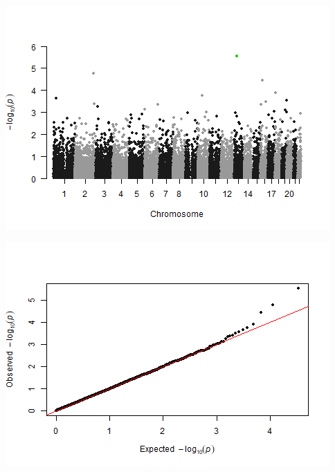 \documentclass[
]{article}
\newenvironment{Shaded}{\begin{snugshade}}{\end{snugshade}}
\newcommand{\CommentTok}[1]{\textcolor[rgb]{0.56,0.35,0.01}{\textit{#1}}}
\newcommand{\DataTypeTok}[1]{\textcolor[rgb]{0.13,0.29,0.53}{#1}}
\newcommand{\DecValTok}[1]{\textcolor[rgb]{0.00,0.00,0.81}{#1}}
\newcommand{\KeywordTok}[1]{\textcolor[rgb]{0.13,0.29,0.53}{\textbf{#1}}}
\newcommand{\NormalTok}[1]{#1}
\newcommand{\OperatorTok}[1]{\textcolor[rgb]{0.81,0.36,0.00}{\textbf{#1}}}
\newcommand{\OtherTok}[1]{\textcolor[rgb]{0.56,0.35,0.01}{#1}}
\newcommand{\StringTok}[1]{\textcolor[rgb]{0.31,0.60,0.02}{#1}}
\begin{document}
\begin{Shaded}
\end{Shaded}

\includegraphics{stats-gene-research-progress-v8_files/figure-latex/OneCasualGene-1.png}

\begin{Shaded}
\end{Shaded}

\includegraphics{stats-gene-research-progress-v8_files/figure-latex/OneCasualGene-2.png}
\end{document}
